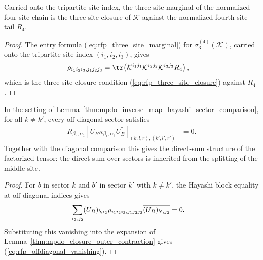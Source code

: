 \begin{lemma}
    \label{thm:mpdo_three_site_closure_reduced}
    \leanok
    Carried onto the tripartite site index, the three-site marginal of the
    normalized four-site chain is the three-site closure of $\mathcal K$
    against the normalized fourth-site tail $R_4$.
\end{lemma}

\begin{proof}
    \leanok
    The entry formula (\ref{eq:rfp_three_site_marginal}) for
    $\sigma_3^{(4)}(\mathcal K)$, carried onto the tripartite site index
    $(i_1,i_2,i_3)$, gives
    \begin{align}
        \rho_{i_1i_2i_3,j_1j_2j_3}
         & =\tr\!\left(\mathcal K^{i_1j_1}\mathcal K^{i_2j_2}
        \mathcal K^{i_3j_3}R_4\right),
        \notag
    \end{align}
    which is the three-site closure condition
    (\ref{eq:rfp_three_site_closure}) against $R_4$.
\end{proof}

\begin{lemma}
    \label{thm:mpdo_inverse_map_hayashi_sector_offdiagonal}
    \leanok
    In the setting of
    Lemma~\ref{thm:mpdo_inverse_map_hayashi_sector_comparison}, for all
    $k\ne k'$, every off-diagonal sector satisfies
    \begin{align}
        R_{\beta_3,\alpha_1}
        \left[U_B\kappa_{\beta_1,\alpha_3}U_B^\dagger\right]_{(k,l,r),(k',l',r')}
         & =0.
        \label{eq:rfp_offdiagonal_vanishing}
    \end{align}
    Together with the diagonal comparison this gives the direct-sum structure
    of the factorized tensor: the direct sum over sectors is inherited from
    the splitting of the middle site.
\end{lemma}

\begin{proof}
    \leanok
    For $b$ in sector $k$ and $b'$ in sector $k'$ with $k\ne k'$, the Hayashi
    block equality at off-diagonal indices gives
    \begin{align}
        \sum_{i_2,j_2}(U_B)_{b,i_2}
        \rho_{i_1i_2i_3,j_1j_2j_3}
        \overline{(U_B)_{b',j_2}}
         & =0.
        \notag
    \end{align}
    Substituting this vanishing into the expansion of
    Lemma~\ref{thm:mpdo_closure_outer_contraction}
    gives (\ref{eq:rfp_offdiagonal_vanishing}).
\end{proof}


